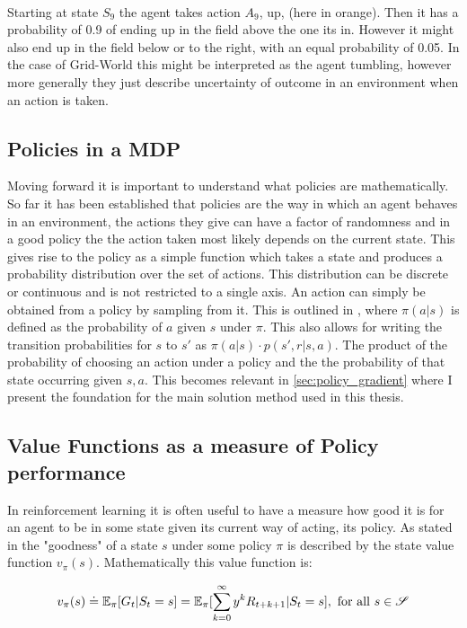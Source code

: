 \noindent
\\ Starting at state $S_9$ the agent takes action $A_9$, up, (here in orange). Then it has a probability of 0.9 of ending up in the field above the one its in. However it might also end up in the field below or to the right, with an equal probability of 0.05. In the case of Grid-World this might be interpreted as the agent tumbling, however more generally they just describe uncertainty of outcome in an environment when an action is taken.

\subsection{Policies in a MDP}\label{subsec:policies}
Moving forward it is important to understand what policies are mathematically. So far it has been established that policies are the way in which an agent behaves in an environment, the actions they give can have a factor of randomness and in a good policy the the action taken most likely depends on the current state. This gives rise to the policy as a simple function which takes a state and produces a probability distribution over the set of actions. This distribution can be discrete or continuous and is not restricted to a single axis. An action can simply be obtained from a policy by sampling from it. This is outlined in , where $\pi(a|s)$ is defined as the probability of $a$ given $s$ under $\pi$. This also allows for writing the transition probabilities for $s$ to $s'$ as $\pi(a|s) \cdot p(s', r|s, a)$. The product of the probability of choosing an action under a policy and the the probability of that state occurring given $s, a$. This becomes relevant in \ref{sec:policy_gradient} where I present the foundation for the main solution method used in this thesis.

\subsection{Value Functions as a measure of Policy  performance}\label{sec:value_functions}
In reinforcement learning it is often useful to have a measure how good it is for an agent to be in some state given its current way of acting, its policy. As stated in  the "goodness" of a state $s$ under some policy $\pi$ is described by the state value function $v_\pi(s)$. Mathematically this value function is:

\begin{equation}\label{state_value_function}
    v_\pi(s) \doteq \mathbb{E}_\pi[G_t | S_t=s] = \mathbb{E}_\pi[\sum_{k=0}^{\infty} y^k R_{t+k+1}|S_t=s] , \mathrm{\ for\ all\ } s \in \mathset{S}
\end{equation}
\centerline{\small{}}

